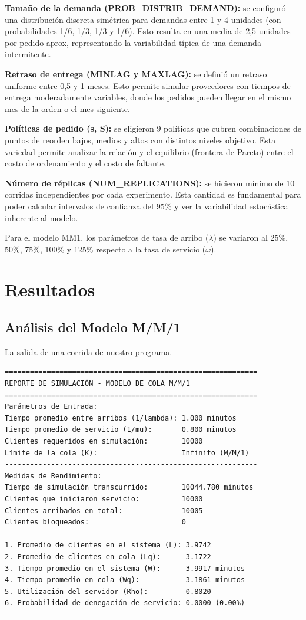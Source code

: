\documentclass{article}
\begin{document}
\textbf{Tamaño de la demanda (PROB\_DISTRIB\_DEMAND):} se configuró una distribución discreta simétrica para demandas entre 1 y 4 unidades (con probabilidades 1/6, 1/3, 1/3 y 1/6). Esto resulta en una media de 2,5 unidades por pedido aprox, representando la variabilidad típica de una demanda intermitente.

\textbf{Retraso de entrega (MINLAG y MAXLAG):} se definió un retraso uniforme entre 0,5 y 1 meses. Esto permite simular proveedores con tiempos de entrega moderadamente variables, donde los pedidos pueden llegar en el mismo mes de la orden o el mes siguiente.

\textbf{Políticas de pedido (s, S):} se eligieron 9 políticas que cubren combinaciones de puntos de reorden bajos, medios y altos con distintos niveles objetivo. Esta variedad permite analizar la relación y el equilibrio (frontera de Pareto) entre el costo de ordenamiento y el costo de faltante.

\textbf{Número de réplicas (NUM\_REPLICATIONS):} se hicieron mínimo de 10 corridas independientes por cada experimento. Esta cantidad es fundamental para poder calcular intervalos de confianza del 95\% y ver la variabilidad estocástica inherente al modelo.

Para el modelo MM1, los parámetros de tasa de arribo ($\lambda$) se variaron al 25\%, 50\%, 75\%, 100\% y 125\% respecto a la tasa de servicio ($\omega$).




\section{Resultados}
\label{sec:resultados}

\subsection{Análisis del Modelo M/M/1}

La salida de una corrida de nuestro programa.

\begin{verbatim}
============================================================
REPORTE DE SIMULACIÓN - MODELO DE COLA M/M/1
============================================================
Parámetros de Entrada:
Tiempo promedio entre arribos (1/lambda): 1.000 minutos
Tiempo promedio de servicio (1/mu):       0.800 minutos
Clientes requeridos en simulación:        10000
Límite de la cola (K):                    Infinito (M/M/1)
------------------------------------------------------------
Medidas de Rendimiento:
Tiempo de simulación transcurrido:        10044.780 minutos
Clientes que iniciaron servicio:          10000
Clientes arribados en total:              10005
Clientes bloqueados:                      0
------------------------------------------------------------
1. Promedio de clientes en el sistema (L): 3.9742
2. Promedio de clientes en cola (Lq):      3.1722
3. Tiempo promedio en el sistema (W):      3.9917 minutos
4. Tiempo promedio en cola (Wq):           3.1861 minutos
5. Utilización del servidor (Rho):         0.8020
6. Probabilidad de denegación de servicio: 0.0000 (0.00%)
------------------------------------------------------------
\end{verbatim}
\end{document}
